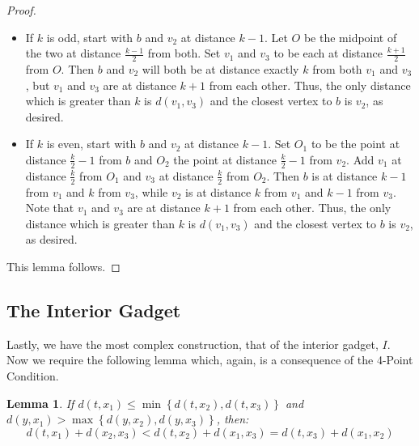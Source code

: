 \documentclass[11pt,letter]{article}
\newtheorem{lemma}[theorem]{Lemma}
\theoremstyle{remark}
\newcommand{\set}[1]{\left\{#1\right\}}
\begin{document}
\begin{proof}
    \begin{itemize}
        \item If $k$ is odd, start with $b$ and $v_2$ at distance $k-1$. Let $O$ be the midpoint of the two at distance $\frac{k-1}{2}$ from both. Set $v_1$ and $v_3$ to be each at distance $\frac{k+1}{2}$ from $O$. Then $b$ and $v_2$ will both be at distance exactly $k$ from both $v_1$ and $v_3$, but $v_1$ and $v_3$ are at distance $k+1$ from each other. Thus, the only distance which is greater than $k$ is $d(v_1,v_3)$ and the closest vertex to $b$ is $v_2$, as desired. 
        \item If $k$ is even, start with $b$ and $v_2$ at distance $k-1$. Set $O_1$ to be the point at distance $\frac{k}{2}-1$ from $b$ and $O_2$ the point at distance $\frac{k}{2}-1$ from $v_2$. Add $v_1$ at distance $\frac{k}{2}$ from $O_1$ and $v_3$ at distance $\frac{k}{2}$ from $O_2$. Then $b$ is at distance $k-1$ from $v_1$ and $k$ from $v_3$, while $v_2$ is at distance $k$ from $v_1$ and $k-1$ from $v_3$. Note that $v_1$ and $v_3$ are at distance $k+1$ from each other. Thus, the only distance which is greater than $k$ is $d(v_1,v_3)$ and the closest vertex to $b$ is $v_2$, as desired. 
    \end{itemize}
This lemma follows.
\end{proof}



\subsection{The Interior Gadget}\label{sec:int}

Lastly, we have the most complex construction, that of 
the interior gadget, $I$. 
Now we require the following lemma which, again, is a consequence of the 4-Point Condition.

\begin{lemma}\label{lem:closer}
    If $d(t,x_1)\leq \min\set{d(t,x_2),d(t,x_3)}$ and $d(y,x_1)>\max\set{d(y,x_2),d(y,x_3)}$, then:
    \[d(t,x_1)+d(x_2,x_3)<d(t,x_2)+d(x_1,x_3)=d(t,x_3)+d(x_1,x_2)\]
\end{lemma}
\end{document}
